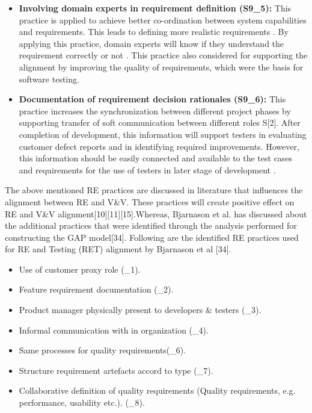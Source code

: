 \documentclass{article}
\begin{document}
\begin{itemize}
    \item \textbf{Involving domain experts in requirement definition (S9\_5):} This practice is applied to achieve better co-ordination between system capabilities and requirements. This leads to defining more realistic requirements \cite{bjarnason2014challenges}. By applying this practice, domain experts will know if they understand the requirement correctly or not \cite{bjarnason2014challenges}. This practice also considered for supporting the alignment by improving the quality of requirements, which were the basis for software testing.
    
    \item \textbf{Documentation of requirement decision rationales (S9\_6):} This practice increases the synchronization between different project phases by supporting transfer of soft communication between different roles S[2]. After completion of development, this information will support testers in evaluating customer defect reports and in identifying required improvements. However, this information should be easily connected and available to the test cases and requirements for the use of testers in later stage of development \cite{bjarnason2014challenges}.

\end{itemize}


The above mentioned RE practices are discussed in literature that influences the alignment between RE and V\&V. These practices will create positive effect on RE and V\&V alignment\cite{bjarnason2014challenges}[10][11][15].Whereas, Bjarnason et al. has discussed about the additional practices that were identified through the analysis performed for constructing the GAP model[34]. Following are the identified RE practices used for RE and Testing (RET) alignment by Bjarnason et al [34].

\begin{itemize}
\item 	Use of customer proxy role (\cite{bjarnason2014alignment}\_1).
\item 	Feature requirement documentation (\cite{bjarnason2014alignment}\_2).
\item 	Product manager physically present to developers \& testers (\cite{bjarnason2014alignment}\_3).
\item 	Informal communication with in organization (\cite{bjarnason2014alignment}\_4).
\item 	Same processes for quality requirements(\cite{bjarnason2014alignment}\_6).
\item 	Structure requirement artefacts accord to type (\cite{bjarnason2014alignment}\_7).
\item 	Collaborative definition of quality requirements (Quality requirements, e.g. performance, usability etc.). (\cite{bjarnason2014alignment}\_8).
\end{itemize}
\end{document}

